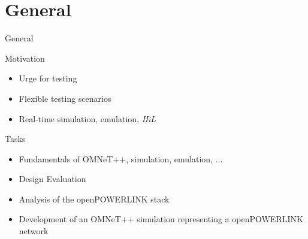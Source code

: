 \section{General}

\begin{frame}{General}
    
    \begin{block}{Motivation}
        \begin{itemize}
            \item Urge for testing
            \item Flexible testing scenarios
            \item Real-time simulation, emulation, \emph{HiL}
        \end{itemize}
    \end{block}
    
    \begin{block}{Tasks}
        \begin{itemize}
            \item Fundamentals of OMNeT++, simulation, emulation, ...
            \item Design Evaluation
            \item Analysis of the openPOWERLINK stack
            \item Development of an OMNeT++ simulation representing a openPOWERLINK network
        \end{itemize}
    \end{block}
    
\end{frame}